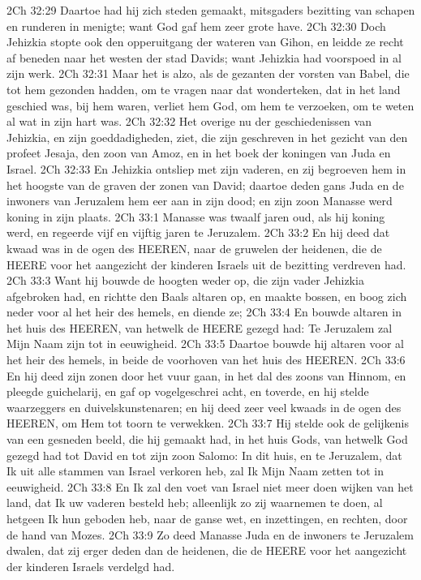 2Ch 32:29  Daartoe had hij zich steden gemaakt, mitsgaders bezitting van schapen en runderen in menigte; want God gaf hem zeer grote have.
2Ch 32:30  Doch Jehizkia stopte ook den opperuitgang der wateren van Gihon, en leidde ze recht af beneden naar het westen der stad Davids; want Jehizkia had voorspoed in al zijn werk.
2Ch 32:31  Maar het is alzo, als de gezanten der vorsten van Babel, die tot hem gezonden hadden, om te vragen naar dat wonderteken, dat in het land geschied was, bij hem waren, verliet hem God, om hem te verzoeken, om te weten al wat in zijn hart was.
2Ch 32:32  Het overige nu der geschiedenissen van Jehizkia, en zijn goeddadigheden, ziet, die zijn geschreven in het gezicht van den profeet Jesaja, den zoon van Amoz, en in het boek der koningen van Juda en Israel.
2Ch 32:33  En Jehizkia ontsliep met zijn vaderen, en zij begroeven hem in het hoogste van de graven der zonen van David; daartoe deden gans Juda en de inwoners van Jeruzalem hem eer aan in zijn dood; en zijn zoon Manasse werd koning in zijn plaats.
2Ch 33:1  Manasse was twaalf jaren oud, als hij koning werd, en regeerde vijf en vijftig jaren te Jeruzalem.
2Ch 33:2  En hij deed dat kwaad was in de ogen des HEEREN, naar de gruwelen der heidenen, die de HEERE voor het aangezicht der kinderen Israels uit de bezitting verdreven had.
2Ch 33:3  Want hij bouwde de hoogten weder op, die zijn vader Jehizkia afgebroken had, en richtte den Baals altaren op, en maakte bossen, en boog zich neder voor al het heir des hemels, en diende ze;
2Ch 33:4  En bouwde altaren in het huis des HEEREN, van hetwelk de HEERE gezegd had: Te Jeruzalem zal Mijn Naam zijn tot in eeuwigheid.
2Ch 33:5  Daartoe bouwde hij altaren voor al het heir des hemels, in beide de voorhoven van het huis des HEEREN.
2Ch 33:6  En hij deed zijn zonen door het vuur gaan, in het dal des zoons van Hinnom, en pleegde guichelarij, en gaf op vogelgeschrei acht, en toverde, en hij stelde waarzeggers en duivelskunstenaren; en hij deed zeer veel kwaads in de ogen des HEEREN, om Hem tot toorn te verwekken.
2Ch 33:7  Hij stelde ook de gelijkenis van een gesneden beeld, die hij gemaakt had, in het huis Gods, van hetwelk God gezegd had tot David en tot zijn zoon Salomo: In dit huis, en te Jeruzalem, dat Ik uit alle stammen van Israel verkoren heb, zal Ik Mijn Naam zetten tot in eeuwigheid.
2Ch 33:8  En Ik zal den voet van Israel niet meer doen wijken van het land, dat Ik uw vaderen besteld heb; alleenlijk zo zij waarnemen te doen, al hetgeen Ik hun geboden heb, naar de ganse wet, en inzettingen, en rechten, door de hand van Mozes.
2Ch 33:9  Zo deed Manasse Juda en de inwoners te Jeruzalem dwalen, dat zij erger deden dan de heidenen, die de HEERE voor het aangezicht der kinderen Israels verdelgd had.
